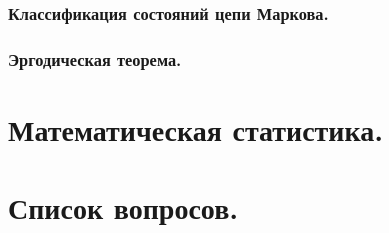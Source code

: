 \documentclass[14pt]{extarticle}
\theoremstyle{breakstyle}
\begin{document}
\subsubsection{Классификация состояний цепи Маркова.}

\subsubsection{Эргодическая теорема.}



\clearpage
\section{Математическая статистика.}



\clearpage
\section{Список вопросов.}
\end{document}

